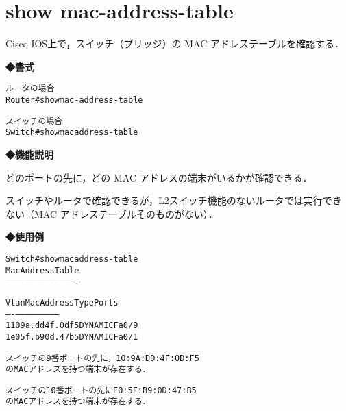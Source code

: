 \section{show mac-address-table}
\label{cmd:ios-mac-address}
Cisco IOS上で，スイッチ（ブリッジ）の MAC アドレステーブルを確認する．

\noindent
{\bf ◆書式}
\begin{center}
\begin{screen}
\begin{alltt}
ルータの場合
Router#show mac-address-table

スイッチの場合
Switch#show mac address-table

\end{alltt}
\end{screen}
\end{center}


{\bf ◆機能説明}

どのポートの先に，どの MAC アドレスの端末がいるかが確認できる．

スイッチやルータで確認できるが，L2スイッチ機能のないルータでは実行できない（MAC アドレステーブルそのものがない）．

{\bf ◆使用例}
\begin{center}
\begin{breakbox}
\begin{alltt}
Switch#show mac address-table
          Mac Address Table
-------------------------------------------

Vlan    Mac Address       Type        Ports
----    -----------       --------    -----
   1    109a.dd4f.0df5    DYNAMIC     Fa0/9
   1    e05f.b90d.47b5    DYNAMIC     Fa0/1

スイッチの9番ポートの先に，10:9A:DD:4F:0D:F5
の MAC アドレスを持つ端末が存在する．

スイッチの10番ポートの先に E0:5F:B9:0D:47:B5
の MAC アドレスを持つ端末が存在する．

\end{alltt}
\end{breakbox}
\end{center}
                

